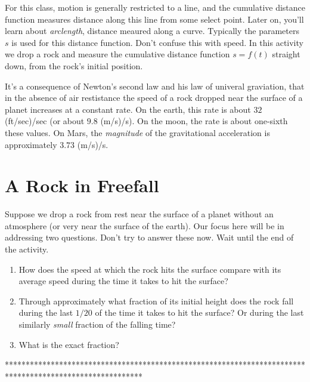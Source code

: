\documentclass{ximera}
\begin{document}
For this class, motion is generally restricted to a line, and the cumulative distance function measures distance along this line from some select point. Later on, you'll learn about \emph{arclength}, distance meaured along a curve. Typically the parameters $s$ is used for this distance function. Don't confuse this with speed. In this activity we drop a rock and measure the cumulative distance function $s=f(t)$ straight down, from the rock's initial position.

It's a consequence of Newton's second law and his law of univeral graviation, that in the absence of air restistance the speed of a rock dropped near the surface of a planet increases at a constant rate. On the earth, this rate is about $32$ (ft/sec)/sec (or about $9.8$ (m/s)/s). On the moon, the rate is about one-sixth these values. On Mars, the \emph{magnitude} of the gravitational acceleration is approximately $3.73$ (m/s)/s.


\section{A Rock in Freefall}
Suppose we drop a rock from rest near the surface of a planet without an atmosphere (or very near the surface of the earth). Our focus here will be in addressing two questions. Don't try to answer these now. Wait until the end of the activity.

\begin{question} \label{Q54rghgeyghhg}

\begin{enumerate}
\item How does the speed at which the rock hits the surface compare with its average speed during the time it takes to hit the surface?

\item Through approximately what fraction of its initial height does the rock fall during the last $1/20$ of the time it takes to hit the surface? Or during the  last similarly \emph{small} fraction of the falling time? 
\item What is the exact fraction? 
\end{enumerate}
\end{question}



\iffalse

*********************************************************************************************************
\end{document}
